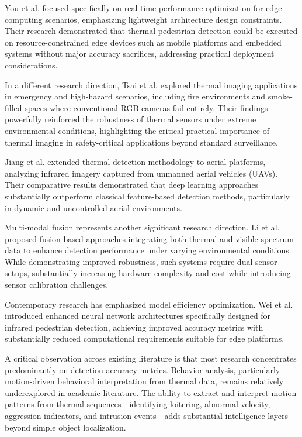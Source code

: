 \documentclass[conference]{IEEEtran}
\begin{document}
You et al. \cite{ref3} focused specifically on real-time performance optimization for edge computing scenarios, emphasizing lightweight architecture design constraints. Their research demonstrated that thermal pedestrian detection could be executed on resource-constrained edge devices such as mobile platforms and embedded systems without major accuracy sacrifices, addressing practical deployment considerations.

In a different research direction, Tsai et al. \cite{ref4} explored thermal imaging applications in emergency and high-hazard scenarios, including fire environments and smoke-filled spaces where conventional RGB cameras fail entirely. Their findings powerfully reinforced the robustness of thermal sensors under extreme environmental conditions, highlighting the critical practical importance of thermal imaging in safety-critical applications beyond standard surveillance.

Jiang et al. \cite{ref5} extended thermal detection methodology to aerial platforms, analyzing infrared imagery captured from unmanned aerial vehicles (UAVs). Their comparative results demonstrated that deep learning approaches substantially outperform classical feature-based detection methods, particularly in dynamic and uncontrolled aerial environments.

Multi-modal fusion represents another significant research direction. Li et al. \cite{ref7} proposed fusion-based approaches integrating both thermal and visible-spectrum data to enhance detection performance under varying environmental conditions. While demonstrating improved robustness, such systems require dual-sensor setups, substantially increasing hardware complexity and cost while introducing sensor calibration challenges.

Contemporary research has emphasized model efficiency optimization. Wei et al. \cite{ref5} introduced enhanced neural network architectures specifically designed for infrared pedestrian detection, achieving improved accuracy metrics with substantially reduced computational requirements suitable for edge platforms.

A critical observation across existing literature is that most research concentrates predominantly on detection accuracy metrics. Behavior analysis, particularly motion-driven behavioral interpretation from thermal data, remains relatively underexplored in academic literature. The ability to extract and interpret motion patterns from thermal sequences—identifying loitering, abnormal velocity, aggression indicators, and intrusion events—adds substantial intelligence layers beyond simple object localization.
\end{document}
